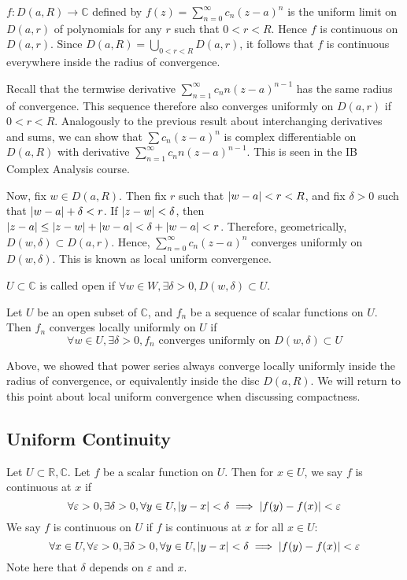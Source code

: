\begin{remark}
	\( f \colon D(a,R) \to \mathbb C \) defined by \( f(z) = \sum_{n=0}^\infty c_n (z-a)^n \) is the uniform limit on \( D(a,r) \) of polynomials for any \( r \) such that \( 0 < r < R \).
	Hence \( f \) is continuous on \( D(a,r) \).
	Since \( D(a,R) = \bigcup_{0 < r < R} D(a,r) \), it follows that \( f \) is continuous everywhere inside the radius of convergence.

	Recall that the termwise derivative \( \sum_{n=1}^\infty c_n n(z-a)^{n-1} \) has the same radius of convergence.
	This sequence therefore also converges uniformly on \( D(a,r) \) if \( 0 < r < R \).
	Analogously to the previous result about interchanging derivatives and sums, we can show that \( \sum c_n (z-a)^n \) is complex differentiable on \( D(a,R) \) with derivative \( \sum_{n=1}^\infty c_n n(z-a)^{n-1} \).
	This is seen in the IB Complex Analysis course.

	Now, fix \( w \in D(a,R) \).
	Then fix \( r \) such that \( \abs{w-a} < r < R \), and fix \( \delta > 0 \) such that \( \abs{w-a} + \delta < r \).
	If \( \abs{z-w} < \delta \), then \( \abs{z-a} \leq \abs{z-w} + \abs{w-a} < \delta + \abs{w-a} < r \).
	Therefore, geometrically, \( D(w,\delta) \subset D(a,r) \).
	Hence, \( \sum_{n=0}^\infty c_n (z-a)^n \) converges uniformly on \( D(w,\delta) \).
	This is known as local uniform convergence.
\end{remark}
\begin{definition}
	\( U \subset \mathbb C \) is called open if \( \forall w \in W, \exists \delta > 0, D(w,\delta) \subset U \).
\end{definition}
\begin{definition}
	Let \( U \) be an open subset of \( \mathbb C \), and \( f_n \) be a sequence of scalar functions on \( U \).
	Then \( f_n \) converges locally uniformly on \( U \) if
	\[
		\forall w \in U, \exists \delta > 0, f_n \text{ converges uniformly on } D(w,\delta) \subset U
	\]
\end{definition}
\begin{remark}
	Above, we showed that power series always converge locally uniformly inside the radius of convergence, or equivalently inside the disc \( D(a,R) \).
	We will return to this point about local uniform convergence when discussing compactness.
\end{remark}

\subsection{Uniform Continuity}
Let \( U \subset \mathbb R, \mathbb C \).
Let \( f \) be a scalar function on \( U \).
Then for \( x \in U \), we say \( f \) is continuous at \( x \) if
\[
	\forall \varepsilon > 0, \exists \delta > 0, \forall y \in U, \abs{y-x} < \delta \implies \abs{f(y)-f(x)} < \varepsilon
\]
We say \( f \) is continuous on \( U \) if \( f \) is continuous at \( x \) for all \( x \in U \):
\[
	\forall x \in U, \forall \varepsilon > 0, \exists \delta > 0, \forall y \in U, \abs{y-x} < \delta \implies \abs{f(y)-f(x)} < \varepsilon
\]
Note here that \( \delta \) depends on \( \varepsilon \) and \( x \).
